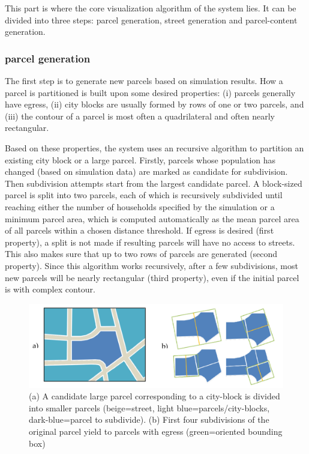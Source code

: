 \documentclass{egpubl}
\begin{document}
This part is where the core visualization algorithm of the system lies. It can be divided into three steps: parcel generation, street generation and parcel-content generation.

\subsubsection{parcel generation}
The first step is to generate new parcels based on simulation results. How a parcel is partitioned is built upon some desired properties: (i) parcels generally have egress, (ii) city blocks are usually formed by rows of one or two parcels, and (iii) the contour of a parcel is most often a quadrilateral and often nearly rectangular.

Based on these properties, the system uses an recursive algorithm to partition an existing city block or a large parcel. Firstly, parcels whose population has changed (based on simulation data) are marked as candidate for subdivision. Then subdivision attempts start from the largest candidate parcel. A block-sized parcel is split into two parcels, each of which is recursively subdivided until reaching either the number of households specified by the simulation or a minimum parcel area, which is computed automatically as the mean parcel area of all parcels within a chosen distance threshold. If egress is desired (first property), a split is not made if resulting parcels will have no access to streets. This also makes sure that up to two rows of parcels are generated (second property). Since this algorithm works recursively, after a few subdivisions, most new parcels will be nearly rectangular (third property), even if the initial parcel is with complex contour.

\begin{figure}[htb]
  \centering
  \includegraphics[width=.95\linewidth]{star-5-2}
  \caption{\label{fig:star-5-2} (a) A candidate large parcel corresponding to a city-block is divided into smaller parcels (beige=street, light blue=parcels/city-blocks, dark-blue=parcel to subdivide). (b) First four subdivisions of the original parcel yield to parcels with egress (green=oriented bounding box)}
\end{figure}
\end{document}
